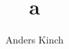\documentclass[12pt, twoside,a4paper]{article}
\title{a}
\author{Anders Kinch}
\date {}
\begin{document}
\maketitle


\medskip

\nocite{*}

%

\end{document}

